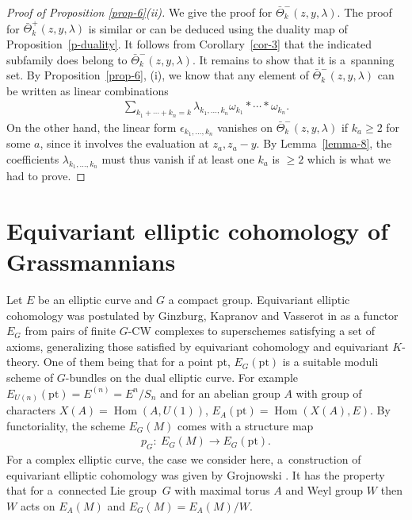 \documentclass[10pt,a4paper]{amsart}
\numberwithin{equation}{section}
\begin{document}
\begin{proof}[Proof of Proposition \ref{prop-6}(ii)] We give the proof for $\bar\Theta^-_k(z,y,\lambda)$. The proof for $\bar\Theta^+_k(z,y,\lambda)$ is similar or can be deduced using the duality map of Proposition~\ref{p-duality}. It follows from Corollary~\ref{cor-3} that the indicated subfamily does belong to $\bar\Theta^-_k(z,y,\lambda)$. It remains to show that it is a~spanning set. By Proposition~\ref{prop-6}, (i), we know that any element of $\bar\Theta^-_k(z,y,\lambda)$ can be written as linear combinations
\begin{gather*}
 \sum_{k_1+\cdots+k_n=k}\lambda_{k_1,\dots,k_n} \omega_{k_1}*\cdots*\omega_{k_n}.
\end{gather*}
On the other hand, the linear form $\epsilon_{k_1,\dots,k_n}$ vanishes on $\bar \Theta^-_k(z,y,\lambda)$ if $k_a\geq2$ for some $a$, since it involves the evaluation at $z_a,z_a-y$. By Lemma~\ref{lemma-8}, the coefficients $\lambda_{k_1,\dots,k_n}$ must thus vanish if at least one $k_a$ is $\geq2$ which is what we had to prove.
\end{proof}

\section{Equivariant elliptic cohomology of Grassmannians}\label{s-4}

Let $E$ be an elliptic curve and $G$ a compact group. Equivariant elliptic cohomology was postulated by Ginzburg, Kapranov and Vasserot in \cite{GKV} as a functor $E_G$ from pairs of finite $G$-CW complexes to superschemes satisfying a set of axioms, generalizing those satisfied by equivariant cohomology and equivariant $K$-theory. One of them being that for a point pt, $E_G(\mathrm{pt})$ is a suitable moduli scheme of $G$-bundles on the dual elliptic curve. For example $E_{U(n)}(\mathrm{pt})=E^{(n)}=E^n/S_n$ and for an abelian group $A$ with group of characters $X(A)=\operatorname{Hom}(A,U(1))$, $E_A(\mathrm{pt})=\operatorname{Hom}(X(A),E)$. By functoriality, the scheme $E_G(M)$ comes with a structure map
\begin{gather*}
 p_G\colon \ E_G(M)\to E_G(\mathrm{pt}).
\end{gather*}
For a complex elliptic curve, the case we consider here, a~construction of equivariant elliptic cohomology was given by Grojnowski \cite{GKV,Grojnowski}. It has the property that for a~connected Lie group~$G$ with maximal torus $A$ and Weyl group $W$ then $W$ acts on $E_A(M)$ and $E_G(M)=E_A(M)/W$.
\end{document}
